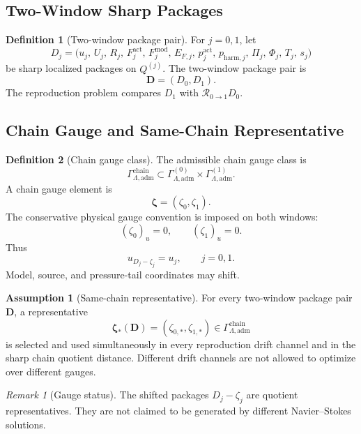 \documentclass[11pt]{article}
\numberwithin{equation}{section}
\theoremstyle{definition}
\newtheorem{definition}[definition]{Definition}
\newtheorem{assumption}[assumption]{Assumption}
\theoremstyle{remark}
\newtheorem{remark}[remark]{Remark}
\newcommand{\adm}{\mathrm{adm}}
\newcommand{\harm}{\mathrm{harm}}
\newcommand{\chain}{\mathrm{chain}}
\newcommand{\calR}{\mathcal R}
\newcommand{\bD}{\mathbf D}
\newcommand{\bzeta}{\boldsymbol\zeta}
\newcommand{\Gchain}{\Gamma_{\Lambda,\adm}^{\chain}}
\begin{document}
\subsection{Two-Window Sharp Packages}
\label{rep:sec:two-window-packages}

\begin{definition}[Two-window package pair]
\label{rep:def:two-window-package-pair}
For \(j=0,1\), let
\[
    D_j
    =
    \bigl(
        u_j,\,
        U_j,\,
        R_j,\,
        F^{\mathrm{act}}_j,\,
        F^{\mathrm{mod}}_j,\,
        E_{F,j},\,
        p^{\mathrm{act}}_j,\,
        p_{\harm,j},\,
        \Pi_j,\,
        \Phi_j,\,
        T_j,\,
        s_j
    \bigr)
\]
be sharp localized packages on \(Q^{(j)}\).  The two-window package pair is
\[
    \bD=(D_0,D_1).
\]
The reproduction problem compares \(D_1\) with \(\calR_{0\to1}D_0\).
\end{definition}

\subsection{Chain Gauge and Same-Chain Representative}
\label{rep:sec:chain-gauge}

\begin{definition}[Chain gauge class]
\label{rep:def:chain-gauge}
The admissible chain gauge class is
\[
    \Gchain
    \subset
    \Gamma_{\Lambda,\adm}^{(0)}
    \times
    \Gamma_{\Lambda,\adm}^{(1)}.
\]
A chain gauge element is
\[
    \bzeta=(\zeta_0,\zeta_1).
\]
The conservative physical gauge convention is imposed on both windows:
\[
    (\zeta_0)_u=0,
    \qquad
    (\zeta_1)_u=0.
\]
Thus
\[
    u_{D_j-\zeta_j}=u_j,\qquad j=0,1.
\]
Model, source, and pressure-tail coordinates may shift.
\end{definition}

\begin{assumption}[Same-chain representative]
\label{rep:ass:same-chain-representative}
For every two-window package pair \(\bD\), a representative
\[
    \bzeta_*(\bD)=(\zeta_{0,*},\zeta_{1,*})\in\Gchain
\]
is selected and used simultaneously in every reproduction drift channel and in
the sharp chain quotient distance.  Different drift channels are not allowed
to optimize over different gauges.
\end{assumption}

\begin{remark}[Gauge status]
The shifted packages \(D_j-\zeta_j\) are quotient representatives.  They are
not claimed to be generated by different Navier--Stokes solutions.
\end{remark}
\end{document}

